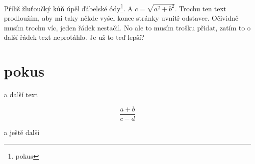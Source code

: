 \documentclass{article}
\begin{document}
 Příliš žluťoučký kůň úpěl ďábelské ódy\footnote{pokus}. A $c=\sqrt{a^2+b^2}$. Trochu ten text prodloužím, aby mi taky někde vyšel konec stránky uvnitř odstavce. Očividně musím trochu víc, jeden řádek nestačil. No ale to musím trošku přidat, zatím to o další řádek text neprotáhlo. Je už to teď lepší? 
 
 \section{pokus}
 
 a další text

\[\frac{a+b}{c-d}\]

a ještě další
\blinddocument
\end{document}
